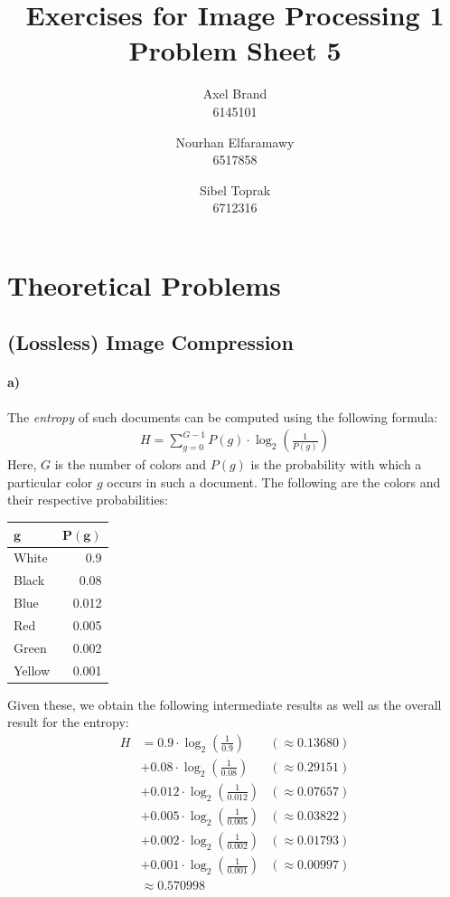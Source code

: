 \documentclass[a4paper,twocolumn]{article}
\title{\textbf{Exercises for Image Processing 1}\\Problem Sheet 5}
\author{Axel Brand\\6145101 \and Nourhan Elfaramawy\\6517858 \and Sibel Toprak\\6712316}
\begin{document}
	\maketitle
	
	\section{Theoretical Problems}
	
	\subsection{(Lossless) Image Compression}
	
	\paragraph{a)} %
	The \textit{entropy} of such documents can be computed using the following formula:
	\begin{align*}
	H = \sum_{g=0}^{G-1} P(g) \cdot \log_{2}\left(\frac{1}{P(g)}\right)
	\end{align*}
	Here, $G$ is the number of colors and $P(g)$ is the probability with which a particular color $g$ occurs in such a document. The following are the colors and their respective probabilities:
	\begin{center}
		\begin{tabular}{l r}
			$\mathbf{g}$ & $\mathbf{P(g)}$ \\
			\hline
			White  & 0.9   \\
			Black  & 0.08  \\
			Blue   & 0.012 \\
			Red    & 0.005 \\
			Green  & 0.002 \\
			Yellow & 0.001 \\
		\end{tabular}
	\end{center}
	Given these, we obtain the following intermediate results as well as the overall result for the entropy:
	\begin{align*}
	H
	&= 0.9 \cdot \log_{2}\left(\frac{1}{0.9}\right)
	&(\approx 0.13680) \\
	&+ 0.08 \cdot \log_{2}\left(\frac{1}{0.08}\right)
	&(\approx 0.29151) \\
	&+ 0.012 \cdot \log_{2}\left(\frac{1}{0.012}\right)
	&(\approx 0.07657) \\
	&+ 0.005 \cdot \log_{2}\left(\frac{1}{0.005}\right)
	&(\approx 0.03822) \\
	&+ 0.002 \cdot \log_{2}\left(\frac{1}{0.002}\right)
	&(\approx 0.01793) \\
	&+ 0.001 \cdot \log_{2}\left(\frac{1}{0.001}\right)
	&(\approx 0.00997) \\
	&\approx 0.570998
	\end{align*}
	
\end{document}
